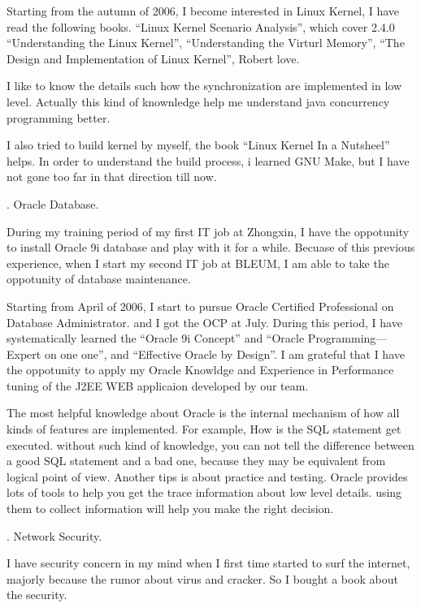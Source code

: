 Starting from the autumn of 2006, I become interested in Linux Kernel, I have
read the following books.
 ``Linux Kernel Scenario Analysis'', which cover 2.4.0
 ``Understanding the Linux Kernel'',
 ``Understanding the Virturl Memory'',
 ``The Design and Implementation of Linux Kernel'', Robert love.
 
I like to know the details such how the synchronization are implemented in 
low level. Actually  this kind of knownledge help me understand java concurrency
programming better.

I also tried to build kernel by myself, the book ``Linux Kernel In a Nutsheel''
helps. In order to understand the build process, i learned GNU Make, but I have
 not gone too far in that direction till now.



{}. Oracle Database.

During my training period of my first IT job at Zhongxin, I have the oppotunity 
to install 
Oracle 9i database and play with it for a while. Becuase of this previous 
experience, when I start my second IT job
at BLEUM, I am able to take the oppotunity of database maintenance.

Starting from April of 2006, I start to pursue Oracle Certified Professional on 
Database Administrator. and I got the OCP at July. During this period, I have 
systematically learned the ``Oracle 9i Concept'' and ``Oracle Programming---%
Expert on one one'', and ``Effective Oracle by Design''. I am grateful that I 
have the oppotunity to apply my Oracle Knowldge and Experience in Performance
tuning of the J2EE WEB applicaion developed by our team.

The most helpful knowledge about Oracle is the internal mechanism of how all 
kinds of features are implemented. For example, How is the SQL statement get
executed. without such kind of knowledge, you can not tell the difference
 between a good SQL statement and a bad one, because they may be equivalent 
 from logical point of view.
 Another tips is about practice and testing. Oracle provides lots of tools to 
 help you get the trace information about low level details. using them to 
 collect information will help you make the right decision.
 
  

{}. Network Security.

I have security concern in my mind when I first time started to surf the 
internet, majorly because the rumor about virus and cracker. So I bought a book
about the security.

